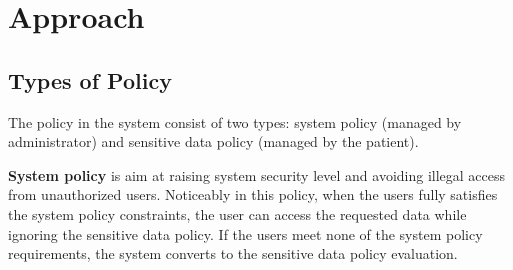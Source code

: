 


\section{Approach}\label{sec:app}

\subsection{Types of Policy}\label{App:Type}
The policy in the system consist of two types: system policy (managed by administrator) and sensitive data policy (managed by the patient).

\textbf{System policy}
is aim at raising system security level and avoiding illegal access from unauthorized users.
Noticeably in this policy, when the users fully satisfies the system policy constraints, the user can access the requested data while ignoring the sensitive data policy.
If the users meet none of the system policy requirements, the system converts to the sensitive data policy evaluation.


